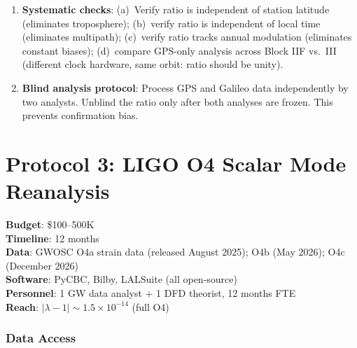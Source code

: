 \documentclass[11pt]{article}
\newcommand{\ee}[1]{\times 10^{#1}}
\newcommand{\lbone}{|\lambda - 1|}
\begin{document}
\begin{enumerate}[label=\textbf{Step \arabic*:}]
\item \textbf{Systematic checks}: (a)~Verify ratio is independent of
  station latitude (eliminates troposphere); (b)~verify ratio is
  independent of local time (eliminates multipath); (c)~verify ratio
  tracks annual modulation (eliminates constant biases); (d)~compare
  GPS-only analysis across Block IIF vs.\ III (different clock hardware,
  same orbit: ratio should be unity).

\item \textbf{Blind analysis protocol}: Process GPS and Galileo data
  independently by two analysts. Unblind the ratio only after both
  analyses are frozen. This prevents confirmation bias.
\end{enumerate}


\part{Protocol 3: LIGO O4 Scalar Mode Reanalysis}
\label{part:ligo}

\begin{tcolorbox}[colback=green!3!white, colframe=actioncolor,
  title=\textbf{PROTOCOL 3: LIGO O4 6th CHANNEL --- DATA AVAILABLE NOW}]
\textbf{Budget}: \$100--500K\\
\textbf{Timeline}: 12 months\\
\textbf{Data}: GWOSC O4a strain data (released August 2025);
  O4b (May 2026); O4c (December 2026)\\
\textbf{Software}: PyCBC, Bilby, LALSuite (all open-source)\\
\textbf{Personnel}: 1 GW data analyst + 1 DFD theorist, 12 months FTE\\
\textbf{Reach}: $\lbone \sim 1.5\ee{-14}$ (full O4)
\end{tcolorbox}

\section{Data Access}
\end{document}
